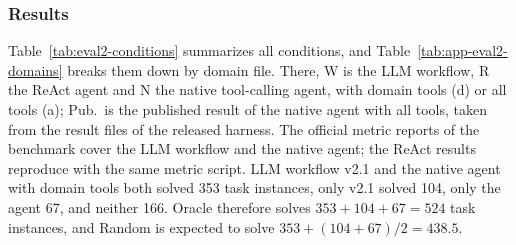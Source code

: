\subsubsection{Results}
\label{app:eval2/results}
Table~\ref{tab:eval2-conditions} summarizes all conditions, and Table~\ref{tab:app-eval2-domains} breaks them down by domain file. There, W is the LLM workflow, R the ReAct agent and N the native tool-calling agent, with domain tools (d) or all tools (a); Pub.\ is the published result of the native agent with all tools, taken from the result files of the released harness. The official metric reports of the benchmark cover the LLM workflow and the native agent; the ReAct results reproduce with the same metric script. LLM workflow v2.1 and the native agent with domain tools both solved 353 task instances, only v2.1 solved 104, only the agent 67, and neither 166. Oracle therefore solves $353+104+67=524$ task instances, and Random is expected to solve $353+(104+67)/2=438.5$.

